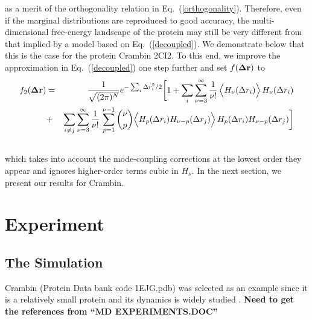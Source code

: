 \documentclass{article}
\begin{document}
as a merit of the orthogonality relation in
Eq.~(\ref{orthogonality}). Therefore, even if the marginal
distributions are reproduced to good accuracy, the multi-dimensional
free-energy landscape of the protein may still be very different from
that implied by a model based on Eq.~(\ref{decoupled}). We demonstrate
below that this is the case for the protein Crambin 2CI2. To this end,
we improve the approximation in Eq.~(\ref{decoupled}) one step
further and set $f({\bf\Delta r})$ to
\begin{eqnarray}
\label{hermite_expansion2}
f_2({\bf\Delta r}) &=& \frac{1}{\sqrt{(2\pi)^N}} e^{ -\sum_i \Delta
  r_i^2/2} \bigg[ 1 + \sum_i\sum_{\nu=3}^\infty
  \frac{1}{\nu!}\, \Big\langle
  H_\nu(\Delta r_i)\Big\rangle\,H_\nu(\Delta r_i) \nonumber \\
&+&  \sum_{i\ne j}\sum_{\nu=3}^\infty
  \frac{1}{\nu!}\,\sum_{p=1}^{\nu-1} {\nu\choose p} \Big\langle
  H_p(\Delta r_i)H_{\nu-p}(\Delta r_j)\Big\rangle\,H_p(\Delta r_i)H_{\nu-p}(\Delta r_j) \bigg] \nonumber \\
&&
\end{eqnarray}
which takes into account the mode-coupling corrections at the lowest
order they appear and ignores higher-order terms cubic in $H_\nu$.
In the next section, we present our results for Crambin.



\section{Experiment}

\subsection{The Simulation}

Crambin (Protein Data bank code 1EJG.pdb) was selected as an example
since it is a relatively small protein and its dynamics is
widely studied \cite{Teeter1990,Levitt1985,Lange2006}.  
{\bf Need to get the references from ``MD EXPERIMENTS.DOC''}
\end{document}
